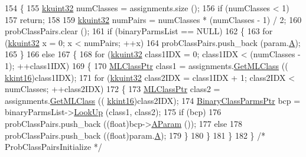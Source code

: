 \begin{DoxyCode}
154 \{
155   \hyperlink{namespace_k_k_b_af8d832f05c54994a1cce25bd5743e19a}{kkuint32}  numClasses = assignments.size ();
156   \textcolor{keywordflow}{if}  (numClasses < 1)
157     \textcolor{keywordflow}{return};
158 
159   \hyperlink{namespace_k_k_b_af8d832f05c54994a1cce25bd5743e19a}{kkuint32}  numPairs   = numClasses * (numClasses - 1) / 2;
160   probClassPairs.clear ();
161   \textcolor{keywordflow}{if}  (binaryParmsList == NULL)
162   \{
163     \textcolor{keywordflow}{for}  (\hyperlink{namespace_k_k_b_af8d832f05c54994a1cce25bd5743e19a}{kkuint32} x = 0;  x < numPairs;  ++x)
164       probClassPairs.push\_back (param.\hyperlink{struct_s_v_m233_1_1svm__parameter_ae77c2459a4305fca375197165412abe2}{A});
165   \}
166   \textcolor{keywordflow}{else}
167   \{
168     \textcolor{keywordflow}{for} (\hyperlink{namespace_k_k_b_af8d832f05c54994a1cce25bd5743e19a}{kkuint32} class1IDX = 0;  class1IDX < (numClasses - 1);  ++class1IDX)
169     \{
170       \hyperlink{class_k_k_m_l_l_1_1_m_l_class}{MLClassPtr}       class1 = assignments.\hyperlink{class_k_k_m_l_l_1_1_class_assignments_a1e6deee5eda8bf069953b65f6a0ef187}{GetMLClass} ((
      \hyperlink{namespace_k_k_b_a93809780ee294124dda4c23069f41248}{kkint16})class1IDX);
171       \textcolor{keywordflow}{for} (\hyperlink{namespace_k_k_b_af8d832f05c54994a1cce25bd5743e19a}{kkuint32} class2IDX = class1IDX + 1;  class2IDX < numClasses;  ++class2IDX)
172       \{
173         \hyperlink{class_k_k_m_l_l_1_1_m_l_class}{MLClassPtr}       class2 = assignments.\hyperlink{class_k_k_m_l_l_1_1_class_assignments_a1e6deee5eda8bf069953b65f6a0ef187}{GetMLClass} ((
      \hyperlink{namespace_k_k_b_a93809780ee294124dda4c23069f41248}{kkint16})class2IDX);
174         \hyperlink{class_k_k_m_l_l_1_1_binary_class_parms}{BinaryClassParmsPtr}  bcp = binaryParmsList->\hyperlink{class_k_k_m_l_l_1_1_binary_class_parms_list_aab855a58369c229e40fa4b9248931a7e}{LookUp} (class1, class2);
175         \textcolor{keywordflow}{if}  (bcp)
176           probClassPairs.push\_back ((\textcolor{keywordtype}{float})bcp->\hyperlink{class_k_k_m_l_l_1_1_binary_class_parms_a30a735931a8328e0dc073644f42db552}{AParam} ());
177         \textcolor{keywordflow}{else}
178           probClassPairs.push\_back ((\textcolor{keywordtype}{float})param.\hyperlink{struct_s_v_m233_1_1svm__parameter_ae77c2459a4305fca375197165412abe2}{A});
179       \}
180     \}
181   \}
182 \}  \textcolor{comment}{/* ProbClassPairsInitialize */}
\end{DoxyCode}
